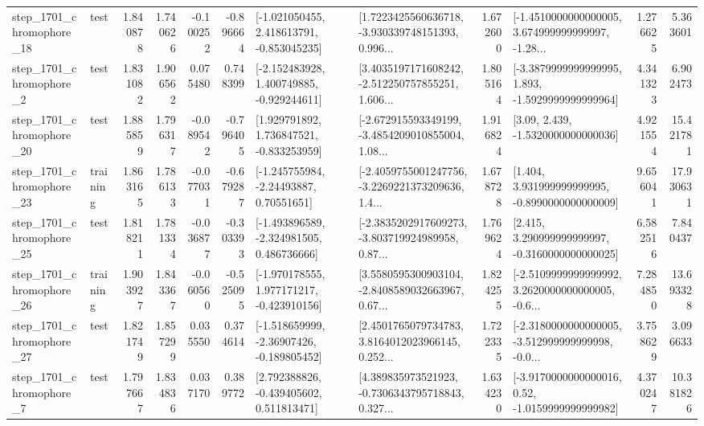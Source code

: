 \begin{tabular}{llrrrrllrlrr}
 step\_1701\_chromophore\_18 &      test &      1.840878 &    1.740626 &     -0.100252 & -0.896664 &   [-1.021050455, 2.418613791, -0.853045235] &  [1.7223425560636718, -3.930339748151393, 0.996... &       1.672600 &  [-1.4510000000000005, 3.674999999999997, -1.28... &            1.276625 &          5.363601 \\
  step\_1701\_chromophore\_2 &      test &      1.831082 &    1.906562 &      0.075480 &  0.748399 &   [-2.152483928, 1.400749885, -0.929244611] &  [3.4035197171608242, -2.512250757855251, 1.606... &       1.805164 &  [-3.3879999999999995, 1.893, -1.5929999999999964] &            4.341323 &          6.902473 \\
 step\_1701\_chromophore\_20 &      test &      1.885859 &    1.796317 &     -0.089542 & -0.796405 &    [1.929791892, 1.736847521, -0.833253959] &  [-2.672915593349199, -3.4854209010855004, 1.08... &       1.916824 &                 [3.09, 2.439, -1.5320000000000036] &            4.921554 &         15.421781 \\
 step\_1701\_chromophore\_23 &  training &      1.863165 &    1.786133 &     -0.077031 & -0.679287 &     [-1.245755984, -2.24493887, 0.70551651] &  [-2.4059755001247756, -3.2269221373209636, 1.4... &       1.678728 &    [1.404, 3.931999999999995, -0.8990000000000009] &            9.656041 &         17.930631 \\
 step\_1701\_chromophore\_25 &      test &      1.818211 &    1.781334 &     -0.036877 & -0.303393 &   [-1.493896589, -2.324981505, 0.486736666] &  [-2.3835202917609273, -3.803719924989958, 0.87... &       1.769624 &    [2.415, 3.290999999999997, -0.3160000000000025] &            6.582516 &          7.840437 \\
 step\_1701\_chromophore\_26 &  training &      1.903927 &    1.843367 &     -0.060560 & -0.525095 &   [-1.970178555, 1.977171217, -0.423910156] &  [3.5580595300903104, -2.8408589032663967, 0.67... &       1.824255 &  [-2.5109999999999992, 3.2620000000000005, -0.6... &            7.284850 &         13.693328 \\
 step\_1701\_chromophore\_27 &      test &      1.821749 &    1.857299 &      0.035550 &  0.374614 &   [-1.518659999, -2.36907426, -0.189805452] &  [2.4501765079734783, 3.8164012023966145, 0.252... &       1.722335 &  [-2.3180000000000005, -3.512999999999998, -0.0... &            3.758629 &          3.096633 \\
  step\_1701\_chromophore\_7 &      test &      1.797667 &    1.834836 &      0.037170 &  0.389772 &    [2.792388826, -0.439405602, 0.511813471] &  [4.389835973521923, -0.7306343795718843, 0.327... &       1.634230 &   [-3.9170000000000016, 0.52, -1.0159999999999982] &            4.370247 &         10.381826 \\

\end{tabular}
